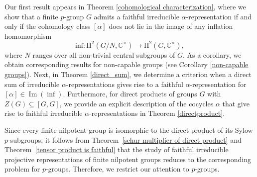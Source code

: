 \documentclass[a4paper,11pt]{amsart}
\numberwithin{equation}{section}
\numberwithin{equation}{subsection}
\begin{document}
	Our first result appears in  Theorem \ref{cohomological characterization}, where we show that a finite $p$-group $G$ admits a faithful irreducible $\alpha$-representation if and only if the cohomology class
	$[\alpha]$ does not lie in the image of any inflation homomorphism
	\[
	\mathrm{inf} \colon
	\mathrm{H}^2\!\left(G/N, \mathbb{C}^{\times}\right)
	\longrightarrow
	\mathrm{H}^2\!\left(G, \mathbb{C}^{\times}\right),
	\]
	where $N$ ranges over all non-trivial central subgroups of $G$. As a corollary, we obtain corresponding results for non-capable groups (see Corollary \ref{non-capable groups}). Next, in Theorem \ref{direct_sum}, we determine a criterion when a direct sum of irreducible $\alpha$-representations gives rise to a faithful $\alpha$-representation for $[\alpha] \in \operatorname{Im}(\operatorname{inf})$. Furthermore, for direct products of groups $G$ with $Z(G) \subseteq [G, G]$, we provide an explicit description of the cocycles $\alpha$ that give rise to faithful irreducible $\alpha$-representations in Theorem \ref{directproduct}. 
	
	Since every finite nilpotent group is isomorphic to the direct product of its Sylow $p$-subgroups, it follows from Theorem~\ref{schur multiplier of direct product} and Theorem~\ref{tensor product is faithful} that the study of faithful irreducible projective representations of finite nilpotent groups reduces to the corresponding problem for $p$-groups. Therefore, we restrict our attention to $p$-groups.
	
\end{document}
